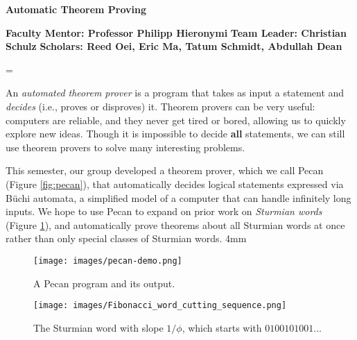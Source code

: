 \documentclass[18pts]{article}
\newcommand\ProjectName[1]{
{
\fontsize{35}{40}\selectfont
\noindent\textbf{#1}\par
}
\vskip 2mm
\fontsize{20}{25}\selectfont
}
\newenvironment{justified}
{
\tolerance=1
\emergencystretch=\maxdimen
\hyphenpenalty=10000
\hbadness=10000
}
\renewcommand\Large{
\noindent\fontsize{18}{20}\selectfont}
\begin{document}
\ProjectName{Automatic Theorem Proving}
\noindent\textbf{Faculty Mentor: {Professor Philipp Hieronymi}
}
\vskip 2mm
\noindent\textbf{Team Leader: {Christian Schulz}
}
\vskip 2mm
\noindent\textbf{Scholars: Reed Oei, Eric Ma, Tatum Schmidt, Abdullah Dean}
\\
\vskip 2mm
\Large

\begin{justified}
An \emph{automated theorem prover} is a program that takes as input a statement and \emph{decides} (i.e., proves or disproves) it. 
Theorem provers can be very useful: computers are reliable, and they never get tired or bored, allowing us to quickly explore new ideas.
Though it is impossible to decide \textbf{all} statements, we can still use theorem provers to solve many interesting problems.\vspace{2mm}

This semester, our group developed a theorem prover, which we call Pecan (Figure \ref{fig:pecan}), that automatically decides logical statements expressed via B\"uchi automata, a simplified model of a computer that can handle infinitely long inputs. 
We hope to use Pecan to expand on prior work on \emph{Sturmian words} (Figure \ref{fig:slope}), and automatically prove theorems about all Sturmian words at once rather than only special classes of Sturmian words. 
\end{justified}

\vskip 4mm

\begin{figure}[h]
\begin{minipage}{.49\textwidth}
\texttt{[image: images/pecan-demo.png]}%
\caption{A Pecan program and its output.}
\label{fig:pecan}
\end{minipage}
\hfill
\begin{minipage}{.49\textwidth}
\texttt{[image: images/Fibonacci\_word\_cutting\_sequence.png]}%
\vspace{-6mm}
\caption{The Sturmian word with slope $1/\phi$, which starts with $0100101001\ldots$}
\label{fig:slope}
\end{minipage}
\end{figure}
\end{document}
